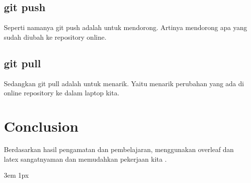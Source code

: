 \documentclass{Academic}
\begin{document}
\subsection{git push}
Seperti namanya git push adalah untuk mendorong. Artinya mendorong apa yang sudah diubah ke repository online.

\subsection{git pull}
Sedangkan git pull adalah untuk menarik. Yaitu menarik perubahan yang ada di online repository ke dalam laptop kita.

\section{Conclusion}
Berdasarkan hasil pengamatan dan pembelajaran, menggunakan overleaf dan latex sangatnyaman dan memudahkan pekerjaan kita \cite{einstein}.



\singlespacing
\emergencystretch 3em
\hfuzz 1px
\printbibliography[heading=bibnumbered]
% 




\end{document}
